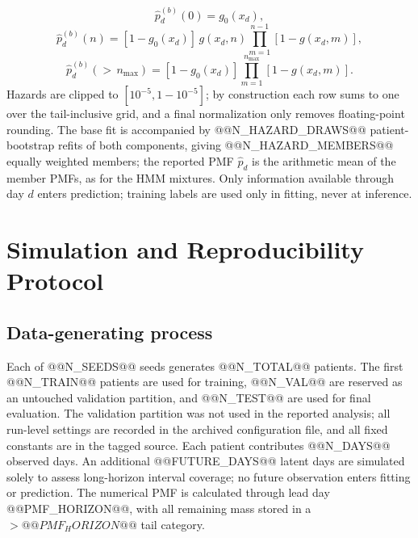 \documentclass{ieeeaccess}
\begin{document}
\begin{enumerate}
\[
\widehat p^{(b)}_d(0) = g_0(x_d),
\]
\[
\widehat p^{(b)}_d(n) = [1 - g_0(x_d)]\, g(x_d, n) \prod_{m=1}^{n-1}[1 - g(x_d, m)],
\]
\[
\widehat p^{(b)}_d({>}\,n_{\max}) = [1 - g_0(x_d)] \prod_{m=1}^{n_{\max}}[1 - g(x_d, m)].
\]
Hazards are clipped to $[10^{-5}, 1-10^{-5}]$; by construction each row sums to one over the tail-inclusive grid, and a final normalization only removes floating-point rounding. The base fit is accompanied by @@N_HAZARD_DRAWS@@ patient-bootstrap refits of both components, giving @@N_HAZARD_MEMBERS@@ equally weighted members; the reported PMF $\widehat p_d$ is the arithmetic mean of the member PMFs, as for the HMM mixtures. Only information available through day $d$ enters prediction; training labels are used only in fitting, never at inference.
\end{enumerate}

\section{Simulation and Reproducibility Protocol}\label{sec:simulation}
\subsection{Data-generating process}
Each of @@N_SEEDS@@ seeds generates @@N_TOTAL@@ patients. The first @@N_TRAIN@@ patients are used for training, @@N_VAL@@ are reserved as an untouched validation partition, and @@N_TEST@@ are used for final evaluation. The validation partition was not used in the reported analysis; all run-level settings are recorded in the archived configuration file, and all fixed constants are in the tagged source. Each patient contributes @@N_DAYS@@ observed days. An additional @@FUTURE_DAYS@@ latent days are simulated solely to assess long-horizon interval coverage; no future observation enters fitting or prediction. The numerical PMF is calculated through lead day @@PMF_HORIZON@@, with all remaining mass stored in a ${>}@@PMF_HORIZON@@$ tail category.
\end{document}
